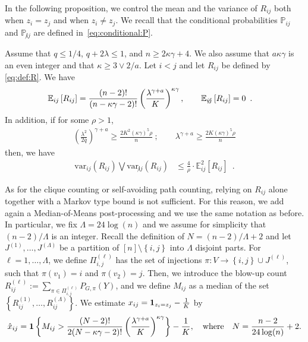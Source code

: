\documentclass[final]{colt2026}
\newcommand{\1}{\mathbf{1}}
\newcommand{\bbE}{\mathbb{E}}
\newcommand{\bbP}{\mathbb{P}}
\newcommand{\ac}[1]{\left\{#1\right\}}
\newcommand{\cro}[1]{\left[#1\right]}
\begin{document}
In the following proposition, we control the mean and the variance of $R_{ij}$ both when $z_{i}=z_{j}$ and when $z_i\neq z_j$. We recall that the conditional probabilities
$\bbP_{ij}$ and $\bbP_{\not ij}$ are defined in~\eqref{eq:conditional:P}.

\begin{proposition}\label{prop:mean:variance:blow_up}
 Assume that $q\leq 1/4$, $q+2\lambda \leq 1$, and $n\geq 2\kappa\gamma +4$. We also assume that $a\kappa \gamma$ is an even integer and that $\kappa\geq 3\vee 2/a$. 
Let $i<j$ and let $R_{ij}$ be defined by \eqref{eq:def:R}.
We have 
\begin{align}
\bbE_{ij}\cro{R_{ij}}&={(n-2)!\over (n-\kappa\gamma-2)!} \left({\lambda^{ \gamma + a } \over K}\right)^{\kappa \gamma }, \label{eq:mean:12:prop:blow_up} \quad \quad 
\bbE_{\not ij}\cro{R_{ij}} = 0 \enspace . 
\end{align}
In addition, if for some $\rho>1$, 
\begin{align}
\left(\frac{\lambda^2}{2\bar q}  \right)^{\gamma + a} \geq \frac{2K^2(\kappa \gamma)^5 \rho}{n}\ ; \quad \quad    \lambda^{\gamma + a}\geq 
 \frac{2K(\kappa \gamma)^5 \rho}{n} \label{eq:cond1:blow_up}
 \end{align}
then, we have
\begin{align}
\mathrm{var}_{ij}(R_{ij})\bigvee  \mathrm{var}_{\not ij}(R_{ij})  & \leq \frac{4}{\rho} \cdot \bbE^2_{ij}\cro{R_{ij}} \label{eq:var:12:prop:blow_up}\enspace . 
\end{align}
\end{proposition}
As for the clique counting or self-avoiding path counting, relying on $R_{ij}$ alone together with a Markov type bound is not sufficient. For this reason, we add again a Median-of-Means post-processing and we use the same notation as before. In particular, we fix $\Lambda= 24\log(n)$ and we assume for simplicity that $(n-2)/\Lambda$ is an integer. Recall 
the  definition of $N=(n-2)/\Lambda+2$ and let $J^{(1)},\ldots,J^{(\Lambda)}$ be a partition of $[n]\setminus\ac{i,j}$ into $\Lambda$ disjoint parts. For $\ell=1,\ldots, \Lambda$, we define $\Pi_{i,j}^{(\ell)}$ has the set of injections $\pi:V\to \ac{i,j}\cup J^{(\ell)}$, such that $\pi(v_{1})=i$ and $\pi(v_{2})=j$. Then, we introduce the blow-up count  $R_{ij}^{(\ell)}:= \sum_{\pi \in \Pi_{i,j}^{(\ell)}} P_{G,\pi}(Y)$, and we define $M_{ij}$ as a median of the set $\ac{R^{(1)}_{ij},\ldots,R^{(\Lambda)}_{ij}}$. We estimate  $x_{ij}={\bf 1}_{z_{i}=z_{j}}-{1\over K}$ by 
\begin{equation}\label{eq:hatx:blow-up}
\hat x_{ij}=\mathbf{1}\ac{M_{ij}> {(N-2)!\over 2(N-\kappa\gamma -2)!} \left({\lambda^{ \gamma + a } \over K}\right)^{\kappa \gamma }}-{1\over K},\quad \text{where}\quad N={n-2\over 24 \log(n)}+2.
\end{equation}
\end{document}
